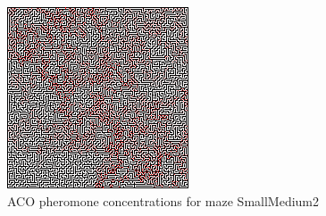 \documentclass[hidelinks,english,conference]{IEEEtran}
\begin{document}
    \begin{figure}
    \centering
    \includegraphics[width=\linewidth]{Small-Medium2_Heatmap_ACO.png}
    \caption{ACO pheromone concentrations for maze SmallMedium2}
    \label{acoSmallMedium2HeatmapImage}
    \end{figure}
      
\end{document}
